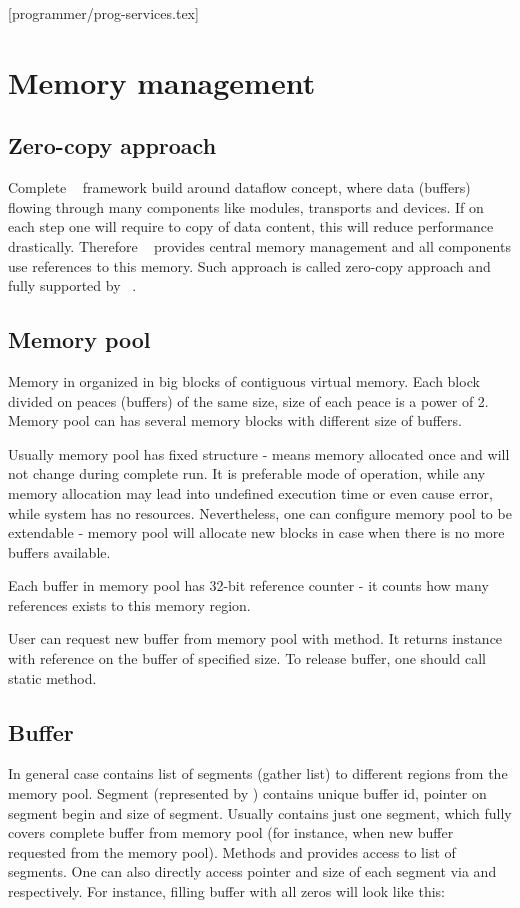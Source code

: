 [programmer/prog-services.tex]

\section{Memory management}
\label{prog_services_memory}
\subsection{Zero-copy approach}
Complete \dabc~ framework build around dataflow concept, where data (buffers) 
flowing through many components like modules, transports and devices. 
If on each step one will require to copy of data content, this will reduce 
performance drastically. Therefore \dabc~ provides central memory management
and all components use references to this memory. 
Such approach is called zero-copy approach and fully supported by \dabc~.


\subsection{Memory pool}
\label{prog_services_memory_pool}
Memory in  organized in big blocks of contiguous virtual memory.
Each block divided on peaces (buffers) of the same size, size of each peace is a power of 2.
Memory pool can has several memory blocks with different size of buffers.

Usually memory pool has fixed structure - means memory allocated once and will not
change during complete run. It is preferable mode of operation, while any 
memory allocation may lead into undefined execution time or even cause error, while
system has no resources. Nevertheless, one can configure memory pool to be extendable -  
memory pool will allocate new blocks in case when there is no more buffers available.   

Each buffer in memory pool has 32-bit reference counter - it counts how many references
exists to this memory region.   

User can request new buffer from memory pool with  method. 
It returns  instance with reference on the buffer of specified size.
To release buffer, one should call  static method.  
 

\subsection{Buffer}
\label{prog_services_memory_buffer}
In general case  contains list of segments (gather list) to different 
regions from the memory pool.
Segment (represented by ) contains unique buffer id, pointer
on segment begin and size of segment. Usually  contains 
just one segment, which fully covers complete buffer from memory pool (for instance, 
when new buffer requested from the memory pool). Methods  and
 provides access to list of segments. One can also directly access
pointer and size of each segment via  and 
respectively. For instance, filling buffer with all zeros will look like this:  
 
